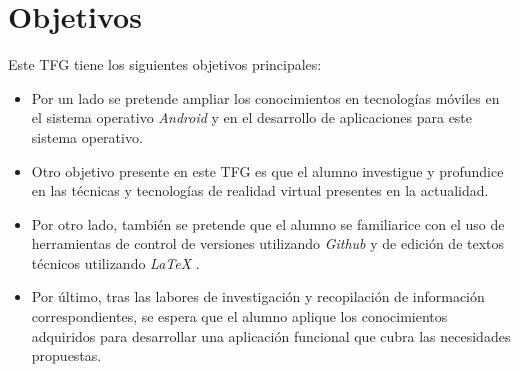 %
%
%
%


\chapter{Objetivos} \label{chap:Objetivos}  

Este TFG tiene los siguientes objetivos principales:

	
\begin{itemize}
\item  	Por un lado se pretende ampliar los conocimientos en tecnologías móviles en el sistema operativo \textit{Android} \cite{URL::Android} y en el desarrollo de aplicaciones para este sistema operativo.
\item   Otro objetivo presente en este TFG es que el alumno investigue y profundice en las técnicas y tecnologías de realidad virtual presentes en la actualidad.
\item   Por otro lado, también se pretende que el alumno se familiarice con el uso de herramientas de control de versiones utilizando \textit{Github} \cite{URL::Github} y de edición de textos técnicos utilizando \textit{LaTeX}  \cite{URL::LaTeX}.
\item   Por último, tras las labores de investigación y recopilación de información correspondientes, se espera que el alumno aplique los conocimientos adquiridos para desarrollar una aplicación funcional que cubra las necesidades propuestas.
\end{itemize} 
